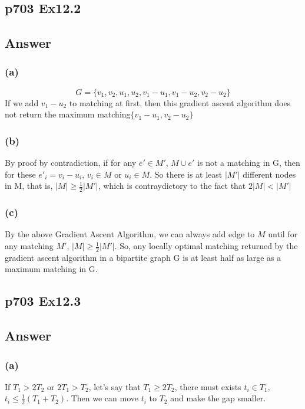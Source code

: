 \documentclass[a4paper]{article}
\begin{document}
\subsection*{p703 Ex12.2}
\subsection*{Answer}
\subsubsection*{(a)}
$$
	G = \{v_1, v_2, u_1, u_2, v_1-u_1, v_1-u_2, v_2-u_2\}
$$
If we add $v_1-u_2$ to matching at first, then this gradient ascent
algorithm does not return the maximum matching$\{v_1-u_1, v_2-u_2\}$

\subsubsection*{(b)}
By proof by contradiction, if for any $e'\in M'$, $M \cup e'$ is not a matching in G, then for these $e'_i = v_i-u_i$, $v_i \in M$ or $u_i \in M$. So there is at least $|M'|$ different nodes in M, that is, $|M| \geq \frac{1}{2}|M'|$, which is contraydictory to the fact that $2|M| < |M'|$

\subsubsection*{(c)}
By the above Gradient Ascent Algorithm, we can always add edge to $M$ until for any matching $M'$, $|M| \geq \frac{1}{2}|M'|$. So, any locally optimal matching returned by the gradient ascent algorithm in a bipartite graph G is at least half as large as a maximum matching in G.

\vspace*{2cm}

\subsection*{p703 Ex12.3}
\subsection*{Answer}
\subsubsection*{(a)}
If $T_1 > 2T_2$ or $2T_1 > T_2$, let's say that $T_1 \geq 2T_2$, there must exists $t_i \in T_1$, $t_{i} \leq \frac{1}{2}(T_1+T_2)$. Then we can move $t_i$ to $T_2$ and make the gap smaller.
\end{document}
